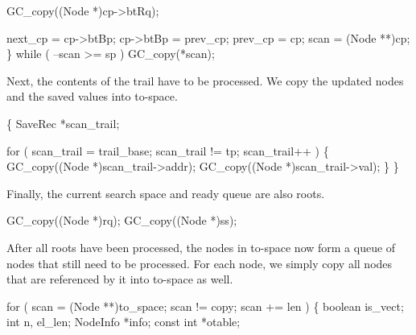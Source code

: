     GC_copy((Node *)cp->btRq);

    next_cp  = cp->btBp;
    cp->btBp = prev_cp;
    prev_cp  = cp;
    scan     = (Node **)cp;
\}
while ( --scan >= sp )
    GC_copy(*scan);

\nwendcode{}\nwdocspar
Next, the contents of the trail have to be processed. We copy the
updated nodes and the saved values into to-space.

\nwenddocs{}\plusendmoddef\nwstartdeflinemarkup{}\nwenddeflinemarkup
\{
    SaveRec *scan_trail;

    for ( scan_trail = trail_base; scan_trail != tp; scan_trail++ )
    \{
        GC_copy((Node *)scan_trail->addr);
        GC_copy((Node *)scan_trail->val);
    \}
\}

\nwendcode{}\nwdocspar
Finally, the current search space and ready queue are also roots.

\nwenddocs{}\plusendmoddef\nwstartdeflinemarkup{}\nwenddeflinemarkup
GC_copy((Node *)rq);
GC_copy((Node *)ss);

\nwendcode{}\nwdocspar
After all roots have been processed, the nodes in to-space now form a
queue of nodes that still need to be processed. For each node, we
simply copy all nodes that are referenced by it into to-space as well.

\nwenddocs{}\endmoddef\nwstartdeflinemarkup{}\nwenddeflinemarkup
for ( scan = (Node **)to_space; scan != copy; scan += len )
\{
    boolean   is_vect;
    int       n, el_len;
    NodeInfo  *info;
    const int *otable;


